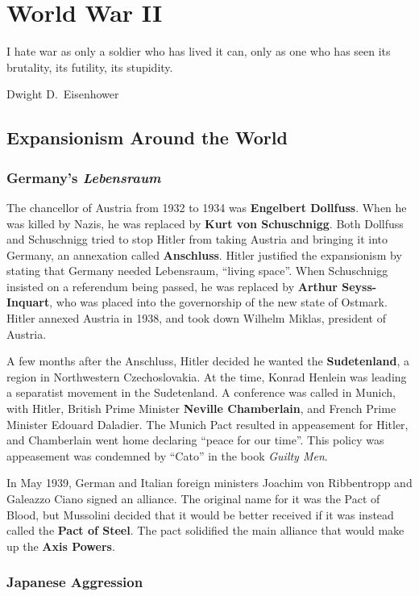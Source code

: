 \chapter{World War II}

\epigraph{%
  I hate war as only a soldier who has lived it can,
  only as one who has seen its brutality, its futility, its stupidity.
}{Dwight D.\ Eisenhower}

\section{Expansionism Around the World}

\subsection*{Germany's \textit{Lebensraum}}

The chancellor of Austria from 1932 to 1934 was \textbf{Engelbert Dollfuss}.
When he was killed by Nazis, he was replaced by \textbf{Kurt von Schuschnigg}.
Both Dollfuss and Schuschnigg tried to stop Hitler from taking Austria and bringing it into Germany,
an annexation called \textbf{Anschluss}.
Hitler justified the expansionism by stating that Germany needed Lebensraum, ``living space''.
When Schuschnigg insisted on a referendum being passed,
he was replaced by \textbf{Arthur Seyss-Inquart},
who was placed into the governorship of the new state of Ostmark.
Hitler annexed Austria in 1938, and took down Wilhelm Miklas, president of Austria.

A few months after the Anschluss, Hitler decided he wanted the \textbf{Sudetenland},
a region in Northwestern Czechoslovakia.
At the time, Konrad Henlein was leading a separatist movement in the Sudetenland.
A conference was called in Munich, with Hitler,
British Prime Minister \textbf{Neville Chamberlain}, and French Prime Minister Edouard Daladier.
The Munich Pact resulted in appeasement for Hitler,
and Chamberlain went home declaring ``peace for our time''.
This policy was appeasement was condemned by ``Cato'' in the book \textit{Guilty Men}.

In May 1939,
German and Italian foreign ministers Joachim von Ribbentropp and Galeazzo Ciano signed an alliance.
The original name for it was the Pact of Blood,
but Mussolini decided that it would be better received
if it was instead called the \textbf{Pact of Steel}.
The pact solidified the main alliance that would make up the \textbf{Axis Powers}.

\subsection*{Japanese Aggression}

